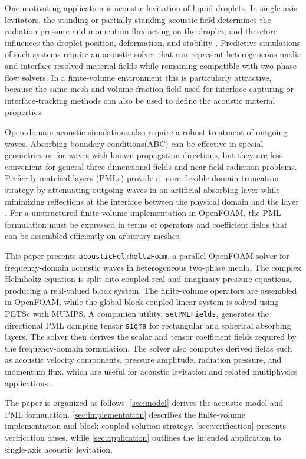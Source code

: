 \documentclass[final,num,12pt]{elsarticle}
\begin{document}
One motivating application is acoustic levitation of liquid droplets. In single-axis levitators, the standing or partially standing acoustic field determines the radiation pressure and momentum flux acting on the droplet, and therefore influences the droplet position, deformation, and stability \cite{andrade2019numerical}. Predictive simulations of such systems require an acoustic solver that can represent heterogeneous media and interface-resolved material fields while remaining compatible with two-phase flow solvers. In a finite-volume environment this is particularly attractive, because the same mesh and volume-fraction field used for interface-capturing or interface-tracking methods can also be used to define the acoustic material properties.

Open-domain acoustic simulations also require a robust treatment of outgoing waves. Absorbing boundary conditions(ABC) can be effective in special geometries or for waves with known propagation directions, but they are less convenient for general three-dimensional fields and near-field radiation problems. Perfectly matched layers (PMLs) provide a more flexible domain-truncation strategy by attenuating outgoing waves in an artificial absorbing layer while minimizing reflections at the interface between the physical domain and the layer \cite{johnson2021notes}. For a unstructured finite-volume implementation in OpenFOAM, the PML formulation must be expressed in terms of operators and coefficient fields that can be assembled efficiently on arbitrary meshes.

This paper presents \texttt{acousticHelmholtzFoam}, a parallel OpenFOAM solver for frequency-domain acoustic waves in heterogeneous two-phase media. The complex Helmholtz equation is split into coupled real and imaginary pressure equations, producing a real-valued block system. The finite-volume operators are assembled in OpenFOAM, while the global block-coupled linear system is solved using PETSc with MUMPS. A companion utility, \texttt{setPMLFields}, generates the directional PML damping tensor \texttt{sigma} for rectangular and spherical absorbing layers. The solver then derives the scalar and tensor coefficient fields required by the frequency-domain formulation. The solver also computes derived fields such as acoustic velocity components, pressure amplitude, radiation pressure, and momentum flux, which are useful for acoustic levitation and related multiphysics applications \cite{Andrade2018review}.

The paper is organized as follows. \cref{sec:model} derives the acoustic model and PML formulation. \cref{sec:implementation} describes the finite-volume implementation and block-coupled solution strategy. \cref{sec:verification} presents verification cases, while \cref{sec:application} outlines the intended application to single-axis acoustic levitation.
\end{document}
